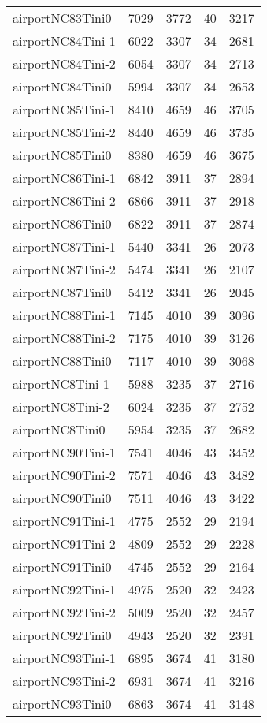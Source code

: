 \documentclass[../../../thesis.tex]{subfiles}
\begin{document}
\begin{longtable}{lrrrr}
airportNC83Tini0 & 7029 & 3772 & 40 & 3217 \\
airportNC84Tini-1 & 6022 & 3307 & 34 & 2681 \\
airportNC84Tini-2 & 6054 & 3307 & 34 & 2713 \\
airportNC84Tini0 & 5994 & 3307 & 34 & 2653 \\
airportNC85Tini-1 & 8410 & 4659 & 46 & 3705 \\
airportNC85Tini-2 & 8440 & 4659 & 46 & 3735 \\
airportNC85Tini0 & 8380 & 4659 & 46 & 3675 \\
airportNC86Tini-1 & 6842 & 3911 & 37 & 2894 \\
airportNC86Tini-2 & 6866 & 3911 & 37 & 2918 \\
airportNC86Tini0 & 6822 & 3911 & 37 & 2874 \\
airportNC87Tini-1 & 5440 & 3341 & 26 & 2073 \\
airportNC87Tini-2 & 5474 & 3341 & 26 & 2107 \\
airportNC87Tini0 & 5412 & 3341 & 26 & 2045 \\
airportNC88Tini-1 & 7145 & 4010 & 39 & 3096 \\
airportNC88Tini-2 & 7175 & 4010 & 39 & 3126 \\
airportNC88Tini0 & 7117 & 4010 & 39 & 3068 \\
airportNC8Tini-1 & 5988 & 3235 & 37 & 2716 \\
airportNC8Tini-2 & 6024 & 3235 & 37 & 2752 \\
airportNC8Tini0 & 5954 & 3235 & 37 & 2682 \\
airportNC90Tini-1 & 7541 & 4046 & 43 & 3452 \\
airportNC90Tini-2 & 7571 & 4046 & 43 & 3482 \\
airportNC90Tini0 & 7511 & 4046 & 43 & 3422 \\
airportNC91Tini-1 & 4775 & 2552 & 29 & 2194 \\
airportNC91Tini-2 & 4809 & 2552 & 29 & 2228 \\
airportNC91Tini0 & 4745 & 2552 & 29 & 2164 \\
airportNC92Tini-1 & 4975 & 2520 & 32 & 2423 \\
airportNC92Tini-2 & 5009 & 2520 & 32 & 2457 \\
airportNC92Tini0 & 4943 & 2520 & 32 & 2391 \\
airportNC93Tini-1 & 6895 & 3674 & 41 & 3180 \\
airportNC93Tini-2 & 6931 & 3674 & 41 & 3216 \\
airportNC93Tini0 & 6863 & 3674 & 41 & 3148 \\

\end{longtable}
\end{document}
